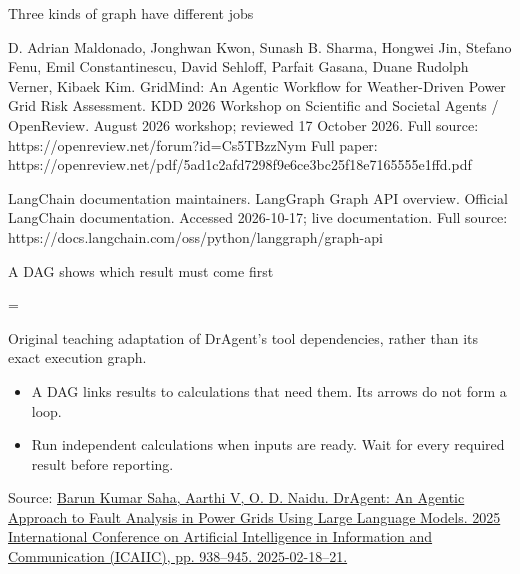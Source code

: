 \begin{frame}[t]{Three kinds of graph have different jobs}
{D. Adrian Maldonado, Jonghwan Kwon, Sunash B. Sharma, Hongwei Jin, Stefano Fenu, Emil Constantinescu, David Sehloff, Parfait Gasana, Duane Rudolph Verner, Kibaek Kim. GridMind: An Agentic Workflow for Weather-Driven Power Grid Risk Assessment. KDD 2026 Workshop on Scientific and Societal Agents / OpenReview. August 2026 workshop; reviewed 17 October 2026.
Full source: https://openreview.net/forum?id=Cs5TBzzNym
Full paper: https://openreview.net/pdf/5ad1c2afd7298f9e6ce3bc25f18e7165555e1ffd.pdf

LangChain documentation maintainers. LangGraph Graph API overview. Official LangChain documentation. Accessed 2026-10-17; live documentation.
Full source: https://docs.langchain.com/oss/python/langgraph/graph-api}
\end{frame}

\begin{frame}[t]{A DAG shows which result must come first}
\relax
\begingroup\begin{minipage}[c][3.8cm][c]{\linewidth}\centering{}=\hbox{\resizebox{.96\linewidth}{!}{}}\ifdim\dimexpr\ht0+\dp0\relax>3.8cm\resizebox{!}{3.8cm}{\box0}\else\box0\fi\par\end{minipage}
{\fontsize{7}{8.3}\selectfont\color{Slate} Original teaching adaptation of DrAgent's tool dependencies, rather than its exact execution graph.\par}
\endgroup\smallskip
{
\small\begin{itemize}
\setlength{\itemsep}{.25em}
\item A DAG links results to calculations that need them. Its arrows do not form a loop.
\item Run independent calculations when inputs are ready. Wait for every required result before reporting.
\end{itemize}\par}
\vfill
{\fontsize{6.3}{7.5}\selectfont\color{Slate} Source: \href{https://www.manuscriptlink.com/society/kics/media?key=kics\%2Fconference\%2Ficaiic2025\%2Fpresentation\%2F1571098105.pdf}{Barun Kumar Saha, Aarthi V, O. D. Naidu. DrAgent: An Agentic Approach to Fault Analysis in Power Grids Using Large Language Models. 2025 International Conference on Artificial Intelligence in Information and Communication (ICAIIC), pp. 938--945. 2025-02-18--21.}\par}
\end{frame}
